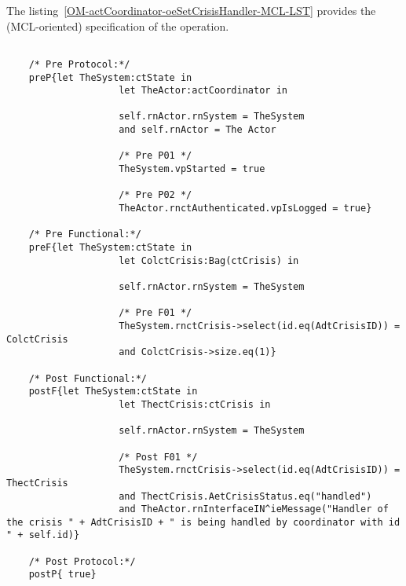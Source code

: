 	\vspace{1cm}
	The listing~\ref{OM-actCoordinator-oeSetCrisisHandler-MCL-LST} provides the \msrmessir (MCL-oriented) specification of the operation.
	
	\scriptsize
	\vspace{0.5cm}
	\begin{lstlisting}[style=MessirStyle,firstnumber=auto,captionpos=b,caption={\msrmessir (MCL-oriented) specification of the operation \emph{oeSetCrisisHandler}.},label=OM-actCoordinator-oeSetCrisisHandler-MCL-LST]

	/* Pre Protocol:*/ 
	preP{let TheSystem:ctState in
					let TheActor:actCoordinator in
					
					self.rnActor.rnSystem = TheSystem
					and self.rnActor = The Actor
					
					/* Pre P01 */
					TheSystem.vpStarted = true
					
					/* Pre P02 */
					TheActor.rnctAuthenticated.vpIsLogged = true}
	
	/* Pre Functional:*/
	preF{let TheSystem:ctState in
					let ColctCrisis:Bag(ctCrisis) in
				
					self.rnActor.rnSystem = TheSystem
				
					/* Pre F01 */
					TheSystem.rnctCrisis->select(id.eq(AdtCrisisID)) = ColctCrisis
					and ColctCrisis->size.eq(1)}
	
	/* Post Functional:*/ 
	postF{let TheSystem:ctState in
					let ThectCrisis:ctCrisis in
				
					self.rnActor.rnSystem = TheSystem
					
					/* Post F01 */
					TheSystem.rnctCrisis->select(id.eq(AdtCrisisID)) = ThectCrisis
					and ThectCrisis.AetCrisisStatus.eq("handled")
					and TheActor.rnInterfaceIN^ieMessage("Handler of the crisis " + AdtCrisisID + " is being handled by coordinator with id " + self.id)}
	
	/* Post Protocol:*/ 
	postP{ true}
	
	\end{lstlisting}
	\normalsize 
	
	
	
	





